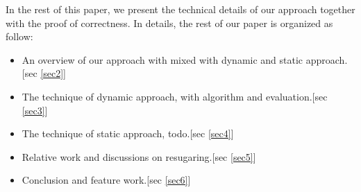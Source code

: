 In the rest of this paper, we present the technical details of our approach together with the proof of correctness. In details, the rest of our paper is organized as follow: 

\begin{itemize}
\item An overview of our approach with mixed with dynamic and static approach.[sec \ref{sec2}]
\item The technique of dynamic approach, with algorithm and evaluation.[sec \ref{sec3}]
\item The technique of static approach, todo.[sec \ref{sec4}]
\item Relative work and discussions on resugaring.[sec \ref{sec5}]
\item Conclusion and feature work.[sec \ref{sec6}]
\end{itemize}
